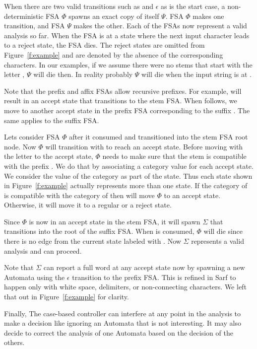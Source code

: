 \documentclass[11pt,letterpaper]{article}
\begin{document}
When there are two valid transitions such as  
and $\epsilon$ as is the start case, a non-deterministic 
FSA $\Phi$ spawns an exact copy of itself $\Psi$. FSA $\Phi$
makes one transition, and FSA $\Psi$ makes the other. 
Each of the FSAs now represent a valid analysis so far. 
When the FSA is at a state where the next input character
leads to a reject state, the FSA dies.
The reject states are omitted from Figure~\ref{f:example}
and are denoted by the absence of the corresponding 
characters. 
In our examples, if we assume there were no stems that start 
with the letter , $\Psi$ will die then. 
In reality probably $\Psi$ will die when the input string
is at . 

Note that the prefix and affix FSAs allow recursive 
prefixes. For example,  will result in an accept state
that transitions to the stem FSA. 
When  follows, we move to another accept state in the 
prefix FSA corresponding to the suffix . 
The same applies to the suffix FSA. 

Lets consider FSA $\Phi$ after it consumed  
and transitioned into the stem FSA root node. 
Now $\Phi$ will transition with  to reach an accept 
state. 
Before moving with the letter  to the accept state,
$\Phi$ needs to make sure that the stem  is compatible
with the prefix . 
We do that by associating a category value for each accept state. 
We consider the value of the category as part of the state.
Thus each state shown in Figure~\ref{f:example} actually represents
more than one state. 
If the category of  is compatible with the category of
 then  will move $\Phi$ to an accept state. 
Otherwise, it will move it to a regular or a reject state. 

Since $\Phi$ is now in an accept state in the stem FSA, it will
spawn $\Sigma$ that transitions into the root of the 
suffix FSA. When  is consumed, $\Phi$ will die since 
there is no edge from the current state labeled with . 
Now $\Sigma$ represents a valid analysis and can proceed.

Note that $\Sigma$ can report a full word at any accept state
now by spawning a new Automata using the $\epsilon$ transition
to the prefix FSA.
This is refined in Sarf to happen only with white space, delimiters, 
or non-connecting characters. 
We left that out in Figure~\ref{f:example} for clarity. 

Finally, The case-based controller can interfere at any point in the 
analysis to make a decision like ignoring an Automata that 
is not interesting. 
It may also decide to correct the analysis of one Automata
based on the decision of the others. 
\end{document}
